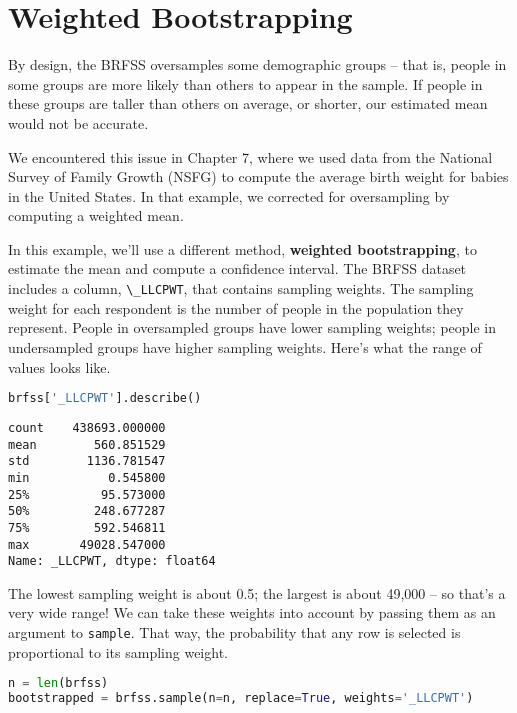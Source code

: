 \section{Weighted Bootstrapping}\label{weighted-bootstrapping}

By design, the BRFSS oversamples some demographic groups -- that is,
people in some groups are more likely than others to appear in the
sample. If people in these groups are taller than others on average, or
shorter, our estimated mean would not be accurate.

We encountered this issue in Chapter 7, where we used data from the
National Survey of Family Growth (NSFG) to compute the average birth
weight for babies in the United States. In that example, we corrected
for oversampling by computing a weighted mean.

In this example, we'll use a different method, \textbf{weighted
bootstrapping}, to estimate the mean and compute a confidence interval.
The BRFSS dataset includes a column, \passthrough{\lstinline!\_LLCPWT!},
that contains sampling weights. The sampling weight for each respondent
is the number of people in the population they represent. People in
oversampled groups have lower sampling weights; people in undersampled
groups have higher sampling weights. Here's what the range of values
looks like.

\begin{lstlisting}[language=Python,style=source]
brfss['_LLCPWT'].describe()
\end{lstlisting}

\begin{lstlisting}[style=output]
count    438693.000000
mean        560.851529
std        1136.781547
min           0.545800
25%          95.573000
50%         248.677287
75%         592.546811
max       49028.547000
Name: _LLCPWT, dtype: float64
\end{lstlisting}

The lowest sampling weight is about 0.5; the largest is about 49,000 --
so that's a very wide range! We can take these weights into account by
passing them as an argument to \passthrough{\lstinline!sample!}. That
way, the probability that any row is selected is proportional to its
sampling weight.

\begin{lstlisting}[language=Python,style=source]
n = len(brfss)
bootstrapped = brfss.sample(n=n, replace=True, weights='_LLCPWT')
\end{lstlisting}

